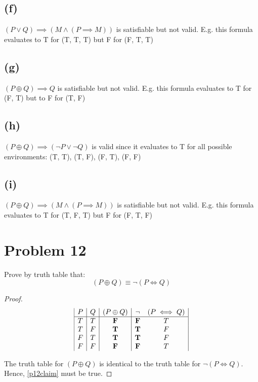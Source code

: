 \documentclass{article}
\begin{document}
\subsection{(f)}
$(P \lor Q) \implies (M \land (P \implies M))$ is satisfiable but not valid. E.g. this formula evaluates to T for (T, T, T) but F for (F, T, T)

\subsection{(g)}
$(P \oplus Q) \implies Q$ is satisfiable but not valid. E.g. this formula evaluates to T for (F, T) but to F for (T, F)

\subsection{(h)}
$(P \oplus Q) \implies (\neg P \lor \neg Q)$ is valid since it evaluates to T for all possible environments: (T, T), (T, F), (F, T), (F, F)

\subsection{(i)}
$(P \oplus Q) \implies (M \land (P \implies M))$ is satisfiable but not valid. E.g. this formula evaluates to T for (T, F, T) but F for (F, T, F)

\pagebreak

\section{Problem 12}
Prove by truth table that:
\begin{equation}\label{p12claim}
	(P \oplus Q) \equiv \neg (P \iff Q)
\end{equation}

\begin{proof}
	\[
		\begin{array}{|c|c|c|c c|}
			P & Q & (P \oplus Q) & \neg       & (P \iff Q) \\
			\hline
			T & T & \mathbf{F}   & \mathbf{F} & T          \\
			T & F & \mathbf{T}   & \mathbf{T} & F          \\
			F & T & \mathbf{T}   & \mathbf{T} & F          \\
			F & F & \mathbf{F}   & \mathbf{F} & T
		\end{array}
	\]

	The truth table for $(P \oplus Q)$ is identical to the truth table for $\neg (P \iff Q)$. Hence, \eqref{p12claim} must be true.
\end{proof}
\end{document}
